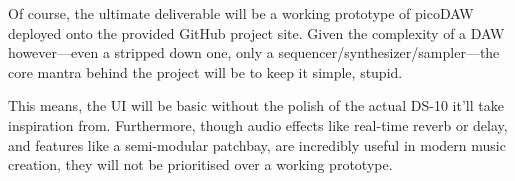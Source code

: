 \noindent
Of course, the ultimate deliverable will be a working prototype of picoDAW deployed onto the 
provided GitHub project site. Given the complexity of a DAW however---even a stripped down 
one, only a sequencer/synthesizer/sampler---the core mantra behind the project will be to 
keep it simple, stupid. 

This means, the UI will be basic without the polish of the actual 
DS-10 it'll take inspiration from. Furthermore, though audio effects like real-time reverb 
or delay, and features like a semi-modular patchbay, are incredibly useful in modern music 
creation, they will not be prioritised over a working prototype.

